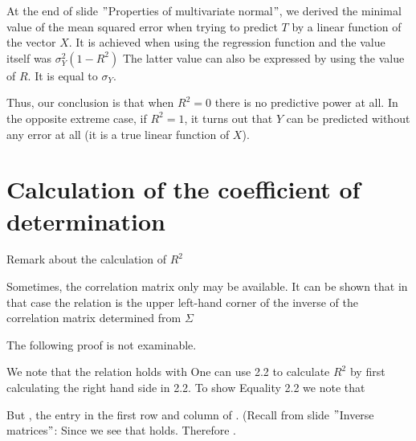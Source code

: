 \documentclass[11pt]{article}
\begin{document}
At the end of slide \("\)Properties of multivariate normal\("\), we derived the
minimal value of the mean squared error when trying to predict $T$ by a linear
function of the vector $X$.
It is achieved when using the regression function and the value itself was
$\sigma_{Y}^{2}(1-R^2)$
The latter value can also be expressed by using the value of $R$.
It is equal to $\sigma_{Y}$.

Thus, our conclusion is that when $R^2 = 0$ there is no predictive power at all.
In the opposite extreme case, if $R^2 = 1$, it turns out that $Y$ can be
predicted without any error at all (it is a true linear function of $X$).

\section{Calculation of the coefficient of determination}\label{sec:calculation-of-the-coefficient-of-determination}
Remark about the calculation of $R^2$

Sometimes, the correlation matrix only may be available.
It can be shown that in that case the relation
is the upper left-hand corner of the inverse of the correlation matrix
 determined from $\Sigma$

The following proof is not examinable.

We note that the relation  holds with
One can use 2.2 to calculate $R^2$ by first calculating the right hand side in 2.2.
To show Equality 2.2 we note that


But , the entry in the first row and column of . (Recall from slide \("\)Inverse matrices\("\):
Since  we see that  holds.
Therefore .
\end{document}
